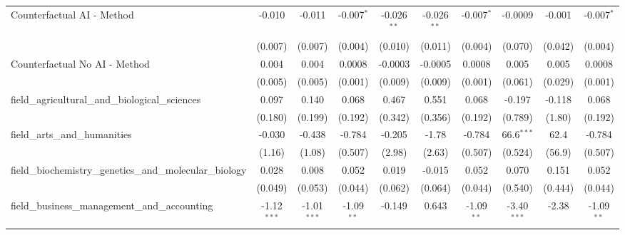 \begin{tabular}{lccccccccc}
   Counterfactual AI - Method                                  & -0.010         & -0.011         & -0.007$^{*}$  & -0.026$^{**}$ & -0.026$^{**}$ & -0.007$^{*}$  & -0.0009       & -0.001  & -0.007$^{*}$\\   
                                                               & (0.007)        & (0.007)        & (0.004)       & (0.010)       & (0.011)       & (0.004)       & (0.070)       & (0.042) & (0.004)\\   
   Counterfactual No AI - Method                               & 0.004          & 0.004          & 0.0008        & -0.0003       & -0.0005       & 0.0008        & 0.005         & 0.005   & 0.0008\\   
                                                               & (0.005)        & (0.005)        & (0.001)       & (0.009)       & (0.009)       & (0.001)       & (0.061)       & (0.029) & (0.001)\\   
   field\_agricultural\_and\_biological\_sciences              & 0.097          & 0.140          & 0.068         & 0.467         & 0.551         & 0.068         & -0.197        & -0.118  & 0.068\\   
                                                               & (0.180)        & (0.199)        & (0.192)       & (0.342)       & (0.356)       & (0.192)       & (0.789)       & (1.80)  & (0.192)\\   
   field\_arts\_and\_humanities                                & -0.030         & -0.438         & -0.784        & -0.205        & -1.78         & -0.784        & 66.6$^{***}$  & 62.4    & -0.784\\   
                                                               & (1.16)         & (1.08)         & (0.507)       & (2.98)        & (2.63)        & (0.507)       & (0.524)       & (56.9)  & (0.507)\\   
   field\_biochemistry\_genetics\_and\_molecular\_biology      & 0.028          & 0.008          & 0.052         & 0.019         & -0.015        & 0.052         & 0.070         & 0.151   & 0.052\\   
                                                               & (0.049)        & (0.053)        & (0.044)       & (0.062)       & (0.064)       & (0.044)       & (0.540)       & (0.444) & (0.044)\\   
   field\_business\_management\_and\_accounting                & -1.12$^{***}$  & -1.01$^{***}$  & -1.09$^{**}$  & -0.149        & 0.643         & -1.09$^{**}$  & -3.40$^{***}$ & -2.38   & -1.09$^{**}$\\   

\end{tabular}
